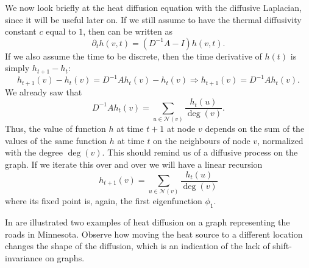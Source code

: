 \documentclass[12pt,a4paper]{report}
\theoremstyle{definition}
\begin{document}
We now look briefly at the heat diffusion equation with the diffusive Laplacian, since it will be useful later on.
If we still assume to have the thermal diffusivity constant $c$ equal to $1$, then  can be written as
\begin{equation*}
    \partial _t h(v, t) = ( D^{-1} A - I ) h(v, t) .
\end{equation*}
If we also assume the time to be discrete, then the time derivative of $h(t)$ is simply $h_{t+1}- h_t$:
\begin{equation*}
    h_{t+1}(v) - h_t(v) = D^{-1} A h_t(v) - h_t(v) \Longrightarrow h_{t+1}(v) = D^{-1} A h_t(v) .
\end{equation*}
We already saw that
\begin{equation*}
    D^{-1} A h_t (v) = \sum_{u \in \mathcal{N}(v)} \frac{h_t(u)}{\deg (v)} .
\end{equation*}
Thus, the value of function $h$ at time $t+1$ at node $v$ depends on the sum of the values of the same function $h$ at time $t$ on the neighbours of node $v$, normalized with the degree $\deg (v)$.
This should remind us of a diffusive process on the graph.
If we iterate this over and over we will have a linear recursion
\begin{equation*}
    h_{t+1} (v) = \sum_{u \in \mathcal{N}(v)} \frac{h_t(u)}{\deg (v)}
\end{equation*}
where its fixed point is, again, the first eigenfunction $\phi _1$.

In  are illustrated two examples of heat diffusion on a graph representing the roads in Minnesota.
Observe how moving the heat source to a different location changes the shape of the diffusion, which is an indication of the lack of shift-invariance on graphs.


\end{document}
